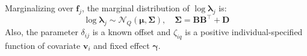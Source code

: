\documentclass[]{report}
\theoremstyle{definition}
\begin{document}
Marginalizing over $\bm{f}_{j}$, the marginal distribution of $\log \boldsymbol{\lambda}_{j}$ is:
\begin{equation}
		\log \boldsymbol{\lambda}_{j}\sim \mathcal{N}_{Q}(\boldsymbol{\mu}, \boldsymbol{\Sigma}),\quad \boldsymbol{\Sigma}=\mathbf{B}\mathbf{B}^{\top}+\mathbf{D}
\end{equation}
Also, the parameter $\delta_{ij}$ is a known offset and $\zeta_{iq}$ is a positive individual-specified function of covariate $\bm{v}_{i}$ and fixed effect $\bm{\gamma}$. 

\end{document}

